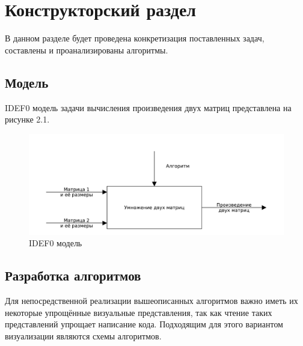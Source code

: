 \chapter{Конструкторский раздел}
\label{cha:design}

В данном разделе будет проведена конкретизация поставленных задач, составлены и проанализированы алгоритмы.

\section{Модель}
IDEF0 модель задачи вычисления произведения двух матриц представлена на рисунке 2.1.
\begin{figure}
    \centering
    \includegraphics[scale=.7]{pdf/mainIdef0.pdf}
    \caption{IDEF0 модель}
\end{figure}

\section{Разработка алгоритмов}
Для непосредственной реализации вышеописанных алгоритмов важно иметь их некоторые упрощённые визуальные представления, так как чтение таких представлений упрощает написание кода. Подходящим для этого вариантом визуализации являются схемы алгоритмов.

